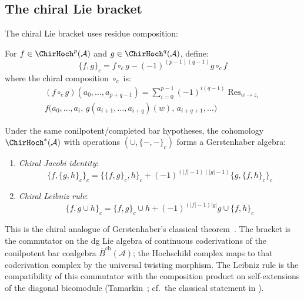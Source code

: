 \subsection{The chiral Lie bracket}

The chiral Lie bracket uses residue composition:

\begin{definition}
For $f \in \ChirHoch^p(\mathcal{A})$ and $g \in \ChirHoch^q(\mathcal{A})$, define:
\[
\{f, g\}_c = f \circ_c g - (-1)^{(p-1)(q-1)} g \circ_c f
\]
where the chiral composition $\circ_c$ is:
\begin{multline}
(f \circ_c g)(a_0, \ldots, a_{p+q-1})
= \sum_{i=0}^{p-1} (-1)^{i(q-1)}
\operatorname{Res}_{w \to z_i}\\
f\bigl(a_0, \ldots, a_i,\, g(a_{i+1}, \ldots, a_{i+q})(w),\,
a_{i+q+1}, \ldots\bigr)
\end{multline}
\end{definition}

\begin{theorem}
\label{thm:chiral-gerstenhaber-kps}
Under the same conilpotent/completed bar hypotheses, the cohomology
$\ChirHoch^*(\mathcal{A})$ with operations $(\cup, \{-,-\}_c)$ forms
a Gerstenhaber algebra:
\begin{enumerate}
\item \emph{Chiral Jacobi identity}:
\[
\{f, \{g, h\}_c\}_c = \{\{f, g\}_c, h\}_c + (-1)^{(|f|-1)(|g|-1)} \{g, \{f, h\}_c\}_c
\]
\item \emph{Chiral Leibniz rule}:
\[
\{f, g \cup h\}_c = \{f, g\}_c \cup h + (-1)^{(|f|-1)|g|} g \cup \{f, h\}_c
\]
\end{enumerate}
This is the chiral analogue of Gerstenhaber's classical theorem~\cite{Ger63}.
The bracket is the commutator on the dg Lie algebra of continuous
coderivations of the conilpotent bar coalgebra
$\bar{B}^{\mathrm{ch}}(\mathcal{A})$; the Hochschild complex maps to
that coderivation complex by the universal twisting morphism.  The
Leibniz rule is the compatibility of this commutator with the
composition product on self-extensions of the diagonal bicomodule
(Tamarkin~\cite{Tamarkin00}; cf.\ the classical statement in
\cite[Thm.~9.3.2]{LV12}).
\end{theorem}


